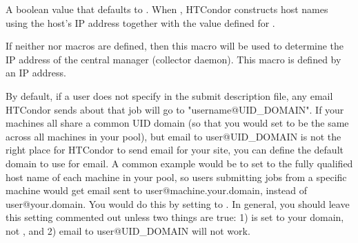 \begin{description}
\label{param:NoDNS}
\item[\Macro{NO\_DNS}]
  A boolean value that defaults to .
  When , HTCondor constructs host names using the host's IP address
  together with the value defined for . 

\label{param:CMIPAddr}
\item[\Macro{CM\_IP\_ADDR}]
  If neither  nor 
   macros are defined, then this
  macro will be used to determine the IP address of the central
  manager (collector daemon).
  This macro is defined by an IP address.

\label{param:EmailDomain}
\item[\Macro{EMAIL\_DOMAIN}]
  By default, if a user does not specify  in the
  submit description file, any email HTCondor sends about that job will
  go to "username@UID\_DOMAIN".
  If your machines all share a common UID domain (so that you would
  set  to be the same across all machines in your
  pool), but email to user@UID\_DOMAIN is not the right place for
  HTCondor to send email for your site, you can define the default
  domain to use for email.
  A common example would be to set  to the fully
  qualified host name of each machine in your pool, so users submitting
  jobs from a specific machine would get email sent to
  user@machine.your.domain, instead of user@your.domain.  
  You would do this by setting  to
  . 
  In general, you should leave this setting commented out unless two
  things are true: 1)  is set to your domain, not
  , and 2) email to user@UID\_DOMAIN will not 
  work. 
  

\end{description}
